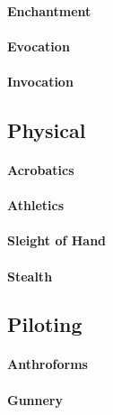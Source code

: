 \paragraph{Enchantment}

\paragraph{Evocation}

\paragraph{Invocation}

\subsection{Physical}

\paragraph{Acrobatics}

\paragraph{Athletics}

\paragraph{Sleight of Hand}

\paragraph{Stealth}


\subsection{Piloting}

\paragraph{Anthroforms}

\paragraph{Gunnery}

